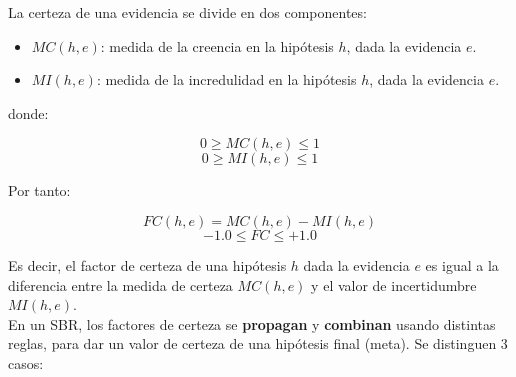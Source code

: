 \documentclass[a4paper,11pt, includehead]{article}
\begin{document}
\noindent La certeza de una evidencia se divide en dos componentes:

\begin{itemize}
	\item $MC(h, e)$: medida de la creencia en la hipótesis $h$, dada la evidencia $e$.
	\item $MI(h, e)$: medida de la incredulidad en la hipótesis $h$, dada la evidencia $e$.
\end{itemize}
donde:

$$0\geq MC(h,e) \leq 1$$
$$0\geq MI(h,e) \leq 1$$

\noindent Por tanto:

$$FC(h,e)=MC(h,e)-MI(h,e)$$
$$ -1.0 \leq FC \leq +1.0 $$

Es decir, el factor de certeza de una hipótesis $h$ dada la evidencia $e$ es igual a la diferencia entre la medida de certeza $MC(h,e)$ y el valor de incertidumbre $MI(h,e)$.\\

\noindent En un SBR, los factores de certeza se \textbf{propagan} y \textbf{combinan} usando distintas reglas, para dar un valor de certeza de una hipótesis final (meta). Se distinguen 3 casos:
\end{document}
